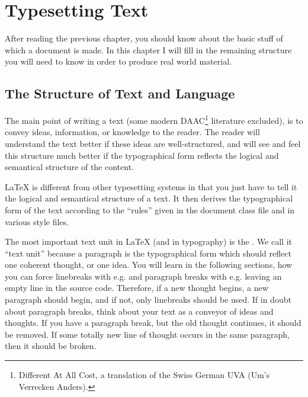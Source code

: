 \chapter{Typesetting Text}

\begin{intro}
  After reading the previous chapter, you should know about the basic
  stuff of which a \LaTeXe{} document is made. In this chapter I
  will fill in the remaining structure you will need to know in order
  to produce real world material.
\end{intro}

\section{The Structure of Text and Language}

The main point of writing a text (some modern DAAC\footnote{Different
  At All Cost, a translation of the Swiss German UVA (Um's Verrecken
  Anders).} literature excluded), is to convey ideas, information, or
knowledge to the reader.  The reader will understand the text better
if these ideas are well-structured, and will see and feel this
structure much better if the typographical form reflects the logical
and semantical structure of the content.

\LaTeX{} is different from other typesetting systems in that you just
have to tell it the logical and semantical structure of a text.  It
then derives the typographical form of the text according to the
``rules'' given in the document class file and in various style files.

The most important text unit in \LaTeX{} (and in typography) is the
.  We call it ``text unit'' because a paragraph is the
typographical form which should reflect one coherent thought, or one
idea.  You will learn in the following sections, how you can force
linebreaks with e.g.{} \texttt{\bs\bs} and paragraph breaks with e.g.{} 
leaving an empty line in the source code.  Therefore, if a new thought
begins, a new paragraph should begin, and if not, only linebreaks
should be used.  If in doubt about paragraph breaks, think about your
text as a conveyor of ideas and thoughts.  If you have a paragraph
break, but the old thought continues, it should be removed.  If some
totally new line of thought occurs in the same paragraph, then it
should be broken.

